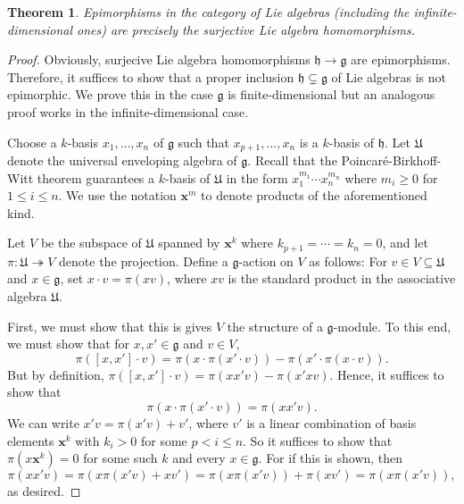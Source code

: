 \documentclass[12pt]{article}
\theoremstyle{thmstyle}
\newtheorem{theorem}{Theorem}[section]
\theoremstyle{defstyle}
\newcommand{\frakg}{\mathfrak{g}}
\newcommand{\frakh}{\mathfrak{h}}
\newcommand{\frakU}{\mathfrak{U}}
\newcommand{\onto}{\twoheadrightarrow}
\renewcommand{\le}{\leqslant}
\renewcommand{\ge}{\geqslant}
\begin{document}
\begin{theorem}
    Epimorphisms in the category of Lie algebras (including the infinite-dimensional ones) are precisely the surjective Lie algebra homomorphisms.
\end{theorem}
\begin{proof}
    Obviously, surjecive Lie algebra homomorphisms $\frakh\to\frakg$ are epimorphisms. Therefore, it suffices to show that a proper inclusion $\frakh\subsetneq\frakg$ of Lie algebras is not epimorphic. We prove this in the case $\frakg$ is finite-dimensional but an analogous proof works in the infinite-dimensional case.

    Choose a $k$-basis $x_1,\dots,x_n$ of $\frakg$ such that $x_{p + 1},\dots,x_{n}$ is a $k$-basis of $\frakh$. Let $\frakU$ denote the universal enveloping algebra of $\frakg$. Recall that the Poincar\'e-Birkhoff-Witt theorem guarantees a $k$-basis of $\frakU$ in the form $x_1^{m_1}\cdots x_n^{m_n}$ where $m_i\ge 0$ for $1\le i\le n$. We use the notation $\mathbf{x}^m$ to denote products of the aforementioned kind.

    Let $V$ be the subspace of $\frakU$ spanned by $\mathbf{x}^k$ where $k_{p + 1} = \cdots = k_n = 0$, and let $\pi: \frakU\onto V$ denote the projection. Define a $\frakg$-action on $V$ as follows: For $v\in V\subseteq\frakU$ and $x\in\frakg$, set $x\cdot v = \pi(x v)$, where $xv$ is the standard product in the associative algebra $\frakU$. 

    First, we must show that this is gives $V$ the structure of a $\frakg$-module. To this end, we must show that for $x,x'\in\frakg$ and $v\in V$, 
    \begin{equation*}
        \pi\left([x, x']\cdot v\right) = \pi(x\cdot\pi(x'\cdot v)) - \pi(x'\cdot\pi(x\cdot v)).
    \end{equation*}
    But by definition, $\pi\left([x, x']\cdot v\right) = \pi(xx'v) - \pi(x'xv)$. Hence, it suffices to show that 
    \begin{equation*}
        \pi\left(x\cdot\pi(x'\cdot v)\right) = \pi(xx'v).
    \end{equation*}
    We can write $x'v = \pi(x'v) + v'$, where $v'$ is a linear combination of basis elements $\mathbf{x}^k$ with $k_i > 0$ for some $p < i\le n$. So it suffices to show that $\pi(x\mathbf{x}^k) = 0$ for some such $k$ and every $x\in\frakg$. For if this is shown, then 
    \begin{equation*}
        \pi(xx'v) = \pi\left(x\pi(x'v) + xv'\right) = \pi(x\pi(x'v)) + \pi(xv') = \pi(x\pi(x'v)),
    \end{equation*}
    as desired.


\end{proof}
\end{document}
